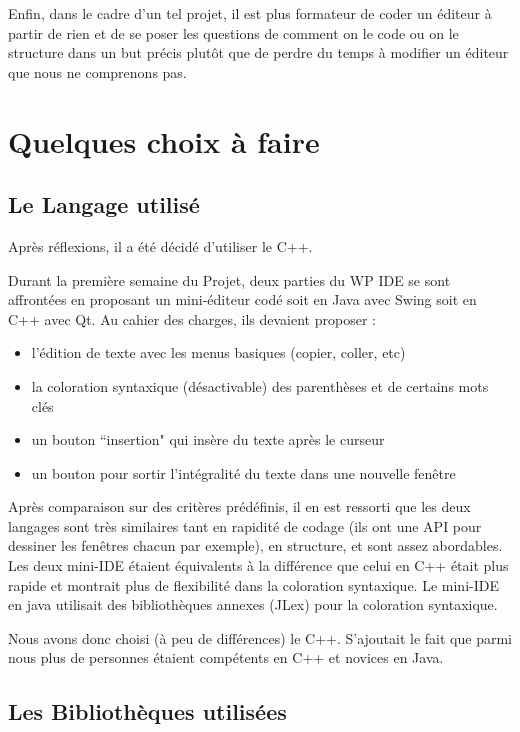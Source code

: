 			Enfin, dans le cadre d'un tel projet, il est plus formateur de coder un éditeur à partir de rien et de se poser les questions de comment on le code ou on le structure dans un but précis plutôt que de perdre du temps à modifier un éditeur que nous ne comprenons pas.

\section{Quelques choix à faire}

    \subsection{Le Langage utilisé}
    
		Après réflexions, il a été décidé d'utiliser le C++.
		
		Durant la première semaine du Projet, deux parties du WP IDE se sont affrontées en proposant un mini-éditeur codé soit en Java avec Swing soit en C++ avec Qt. 
		Au cahier des charges, ils devaient proposer : 
		\begin{itemize}
			\item l'édition de texte avec les menus basiques (copier, coller, etc)
			\item la coloration syntaxique (désactivable) des parenthèses et de certains mots clés
			\item un bouton ``insertion" qui insère du texte après le curseur
			\item un bouton pour sortir l'intégralité du texte dans une nouvelle fenêtre
		\end{itemize}
		Après comparaison sur des critères prédéfinis, il en est ressorti que les deux langages sont très similaires tant en rapidité de codage (ils ont une API pour dessiner les fenêtres chacun par exemple), en structure, et sont assez abordables.
		Les deux mini-IDE étaient équivalents à la différence que celui en C++ était plus rapide et montrait plus de flexibilité dans la coloration syntaxique.
		Le mini-IDE en java utilisait des bibliothèques annexes (JLex) pour la coloration syntaxique.
		
		Nous avons donc choisi (à peu de différences) le C++. S'ajoutait le fait que parmi nous plus de personnes étaient compétents en C++ et novices en Java.
    
    \subsection{Les Bibliothèques utilisées}
    
